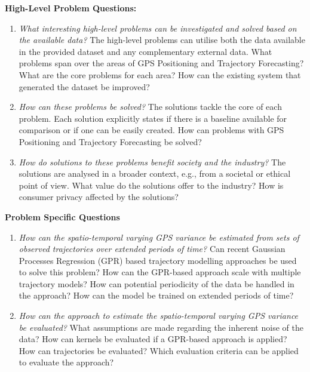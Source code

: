 \begin{description}
  \item \textbf{High-Level Problem Questions:}
  \begin{enumerate}
    \item \textit{What interesting high-level problems can be investigated and solved based on the available data?} \newline
    The high-level problems can utilise both the data available in the provided dataset and any complementary external data.
    What problems span over the areas of GPS Positioning and Trajectory Forecasting?
    What are the core problems for each area?
    How can the existing system that generated the dataset be improved?
    \item \textit{How can these problems be solved?} \newline
    The solutions tackle the core of each problem.
    Each solution explicitly states if there is a baseline available for comparison or if one can be easily created.
    How can problems with GPS Positioning and Trajectory Forecasting be solved?
    \item \textit{How do solutions to these problems benefit society and the industry?} \newline
    The solutions are analysed in a broader context, e.g., from a societal or ethical point of view.
    What value do the solutions offer to the industry?
    How is consumer privacy affected by the solutions?
  \end{enumerate}

  \item \textbf{Problem Specific Questions}
  \begin{enumerate}
    \item \textit{How can the spatio-temporal varying GPS variance be estimated from sets of observed trajectories over extended periods of time?}
    Can recent Gaussian Processes Regression (GPR) based trajectory modelling approaches be used to solve this problem?
    How can the GPR-based approach scale with multiple trajectory models?
    How can potential periodicity of the data be handled in the approach?
    How can the model be trained on extended periods of time?
    \item \textit{How can the approach to estimate the spatio-temporal varying GPS variance be evaluated?} \newline
    What assumptions are made regarding the inherent noise of the data?
    How can kernels be evaluated if a GPR-based approach is applied?
    How can trajectories be evaluated?
    Which evaluation criteria can be applied to evaluate the approach?


\end{enumerate}
\end{description}

